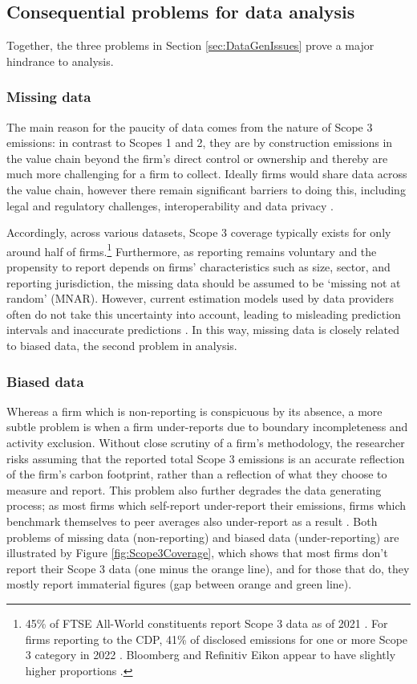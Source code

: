 \documentclass[12pt,twoside]{report}
\begin{document}
\subsection{Consequential problems for data analysis}

Together, the three problems in Section \ref{sec:DataGenIssues} prove a major hindrance to analysis. 
\subsubsection{Missing data}
The main reason for the paucity of data comes from the nature of Scope 3 emissions: in contrast to Scopes 1 and 2, they are by construction emissions in the value chain beyond the firm's direct control or ownership and thereby are much more challenging for a firm to collect. Ideally firms would share data across the value chain, however there remain significant barriers to doing this, including legal and regulatory challenges, interoperability and data privacy \cite{StenzelWaichman2023}. 

Accordingly, across various datasets, Scope 3 coverage typically exists for only around half of firms.\footnote{45\% of FTSE All-World constituents report Scope 3 data as of 2021 \cite{ftserussell2024}. For firms reporting to the CDP, 41\% of disclosed emissions for one or more Scope 3 category in 2022 \cite{cdp2023}. Bloomberg and Refinitiv Eikon appear to have slightly higher proportions \cite{Nguyenetal2023}.} Furthermore, as reporting remains voluntary and the propensity to report depends on firms' characteristics such as size, sector, and reporting jurisdiction, the missing data should be assumed to be `missing not at random' (MNAR). However, current estimation models used by data providers often do not take this uncertainty into account, leading to misleading prediction intervals and inaccurate predictions \cite{olesiewicz2021}. In this way, missing data is closely related to biased data, the second problem in analysis. 

\subsubsection{Biased data}
Whereas a firm which is non-reporting is conspicuous by its absence, a more subtle problem is when a firm under-reports due to boundary incompleteness and activity exclusion. Without close scrutiny of a firm's methodology, the researcher risks assuming that the reported total Scope 3 emissions is an accurate reflection of the firm's carbon footprint, rather than a reflection of what they choose to measure and report. This problem also further degrades the data generating process; as most firms which self-report under-report their emissions, firms which benchmark themselves to peer averages also under-report as a result \cite{Hoepner2021}. Both problems of missing data (non-reporting) and biased data (under-reporting) are illustrated by Figure \ref{fig:Scope3Coverage}, which shows that most firms don't report their Scope 3 data (one minus the orange line), and for those that do, they mostly report immaterial figures (gap between orange and green line). 
\end{document}
